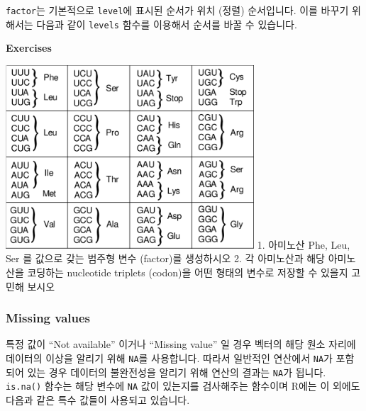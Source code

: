 \documentclass[
]{book}
\newenvironment{Shaded}{\begin{snugshade}}{\end{snugshade}}
\newcommand{\FunctionTok}[1]{\textcolor[rgb]{0.00,0.00,0.00}{#1}}
\newcommand{\NormalTok}[1]{#1}
\newcommand{\OtherTok}[1]{\textcolor[rgb]{0.56,0.35,0.01}{#1}}
\newcommand{\SpecialCharTok}[1]{\textcolor[rgb]{0.00,0.00,0.00}{#1}}
\newcommand{\StringTok}[1]{\textcolor[rgb]{0.31,0.60,0.02}{#1}}
\begin{document}
\texttt{factor}는 기본적으로 \texttt{level}에 표시된 순서가 위치 (정렬) 순서입니다. 이를 바꾸기 위해서는 다음과 같이 \texttt{levels} 함수를 이용해서 순서를 바꿀 수 있습니다.

\begin{Shaded}
\end{Shaded}

\textbf{Exercises}

\includegraphics[width=3.64583in,height=\textheight]{images/03/codon_table.png}
1. 아미노산 Phe, Leu, Ser 를 값으로 갖는 범주형 변수 (factor)를 생성하시오
2. 각 아미노산과 해당 아미노산을 코딩하는 nucleotide triplets (codon)을 어떤 형태의 변수로 저장할 수 있을지 고민해 보시오

\hypertarget{missing-values}{%
\subsubsection{Missing values}\label{missing-values}}

특정 값이 ``Not available'' 이거나 ``Missing value'' 일 경우 벡터의 해당 원소 자리에 데이터의 이상을 알리기 위해 \texttt{NA}를 사용합니다. 따라서 일반적인 연산에서 \texttt{NA}가 포함되어 있는 경우 데이터의 불완전성을 알리기 위해 연산의 결과는 \texttt{NA}가 됩니다. \texttt{is.na()} 함수는 해당 변수에 \texttt{NA} 값이 있는지를 검사해주는 함수이며 R에는 이 외에도 다음과 같은 특수 값들이 사용되고 있습니다.
\end{document}

